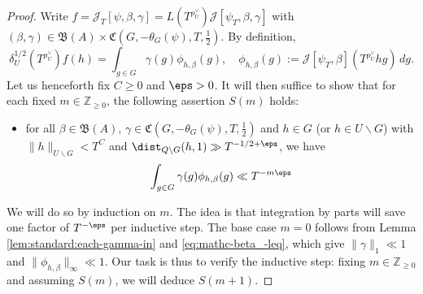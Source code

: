 \begin{proof}
  Write $f = \mathcal{J}_T[\psi,\beta,\gamma] = L(T^{\rho_U^\vee}) \mathcal{J}[\psi_T, \beta, \gamma]$ with $(\beta,\gamma) \in \mathfrak{B}(A) \times  \mathfrak{C}(G,-\theta_G(\psi),T,\tfrac{1}{2})$.  By definition,
  \begin{equation*}
    \delta_U^{1/2}(T^{\rho_U^\vee})
    f(h)
    =
    \int_{g \in G}
    \gamma(g)
    \phi_{h,\beta}(g),
    \quad
    \phi_{h,\beta}(g) :=
    \mathcal{J}[\psi_T, \beta](T^{\rho_U^\vee} h g) \, d g.
  \end{equation*}
  Let us henceforth fix $C \geq 0$ and $\eps > 0$.  It will then suffice to show that for each fixed $m \in \mathbb{Z}_{\geq 0}$, the following assertion $S(m)$ holds:
  \begin{itemize}
  \item for all $\beta \in \mathfrak{B}(A)$, $\gamma \in \mathfrak{C}(G,-\theta_G(\psi),T,\tfrac{1}{2})$ and $h \in G$ (or $h \in U \backslash G$) with $\|h\|_{U \backslash G} < T^C$ and $\dist_{Q \backslash G}(h,1) \gg T^{-1/2+\eps}$, we have
    \begin{equation*}
      \int_{g \in G} \gamma(g) \phi_{h,\beta}(g) \ll T^{-m \eps}
    \end{equation*}
  \end{itemize}
  We will do so by induction on $m$.  The idea is that integration by parts will save one factor of $T^{-\eps}$ per inductive step.  The base case $m = 0$ follows from Lemma \ref{lem:standard:each-gamma-in} and \eqref{eq:mathc-beta_-leq}, which give $\|\gamma \|_1 \ll 1$ and $\|\phi_{h,\beta}\|_{\infty} \ll 1$.  Our task is thus to verify the inductive step: fixing $m \in \mathbb{Z}_{\geq 0}$ and assuming $S(m)$, we will deduce $S(m+1)$.


\end{proof}
